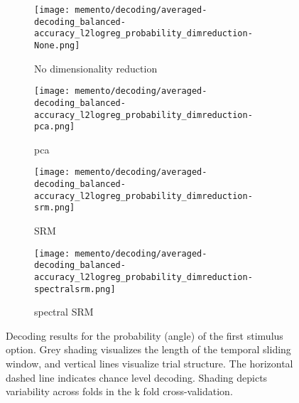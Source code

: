 \begin{figure}
	\centering
	\begin{subfigure}{.49\textwidth}
		\texttt{[image: memento/decoding/averaged-decoding\_balanced-accuracy\_l2logreg\_probability\_dimreduction-None.png]}
		\caption{No dimensionality reduction}
		\label{fig:decoding-probability-none}
	\end{subfigure}
	\begin{subfigure}{0.49\textwidth}
		\texttt{[image: memento/decoding/averaged-decoding\_balanced-accuracy\_l2logreg\_probability\_dimreduction-pca.png]}
		\caption{\gls{pca}}
		\label{fig:decoding-probability-pca}
	\end{subfigure}
	\newline
	\begin{subfigure}{0.49\textwidth}
		\texttt{[image: memento/decoding/averaged-decoding\_balanced-accuracy\_l2logreg\_probability\_dimreduction-srm.png]}
		\caption{\gls{SRM}}
		\label{fig:decoding-probability-srm}
	\end{subfigure}
	\begin{subfigure}{0.49\textwidth}
		\texttt{[image: memento/decoding/averaged-decoding\_balanced-accuracy\_l2logreg\_probability\_dimreduction-spectralsrm.png]}
		\caption{spectral \gls{SRM}}
		\label{fig:decoding-probability-spectralsrm}
	\end{subfigure}
	\caption[Decoding results for probability]{Decoding results for the probability (angle) of the first stimulus option. Grey shading visualizes the length of the temporal sliding window, and vertical lines visualize trial structure. The horizontal dashed line indicates chance level decoding. Shading depicts variability across folds in the k fold cross-validation.}
	\label{fig:decoding-probability}
\end{figure}


